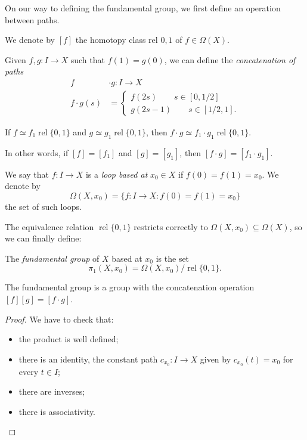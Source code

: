 On our way to defining the fundamental group,
we first
define an operation between paths.

We denote by $[f]$ the homotopy class rel
$0,1$ of
$f\in\Omega(X)$.

\begin{definition}
Given $f,g:I\to X$ such that $f(1)=g(0)$, we
can define
the \emph{concatenation of paths}
$$
\begin{aligned}
f&\cdot g:I\to X\\
f\cdot g(s)&=\begin{cases}
f(2s)\qquad s\in[0,1/2]\\
g(2s-1)\qquad s\in[1/2,1].
\end{cases}
\end{aligned}
$$
\end{definition}

\begin{remark}
If $f\simeq f_1\operatorname{rel}\{0,1\}$ and
$g\simeq g_1\operatorname{rel}\{0,1\}$, then
$f\cdot g\simeq f_1\cdot
g_1\operatorname{rel}\{0,1\}$.

In other words, if $[f]=[f_1]$ and
$[g]=[g_1]$, then
$[f\cdot g]=[f_1\cdot g_1]$.
\end{remark}

\begin{definition}
We say that $f:I\to X$ is a \emph{loop based
at}
$x_0\in X$ if $f(0)=f(1)=x_0$. We denote by
$$
\Omega(X,x_0)=\{f:I\to X:f(0)=f(1)=x_0\}
$$
the set of such loops.
\end{definition}

The equivalence relation
$\operatorname{rel}\{0,1\}$ restricts
correctly to
$\Omega(X,x_0)\subseteq\Omega(X)$, so we can
finally define:

\begin{definition}
The \emph{fundamental group} of $X$ based at
$x_0$ is the
set
$$
\pi_1(X,x_0)
=\Omega(X,x_0)/
\operatorname{rel}\{0,1\}.
$$
\end{definition}

\begin{theorem}
The fundamental group is a group with the
concatenation
operation $[f][g]=[f\cdot g]$.
\end{theorem}

\begin{proof}
We have to check that:
\begin{itemize}
\item the product is well defined;
\item there is an identity, the constant path
$c_{x_0}:I\to X$ given by $c_{x_0}(t)=x_0$
for every
$t\in I$;
\item there are inverses;
\item there is associativity.
\end{itemize}
\end{proof}
